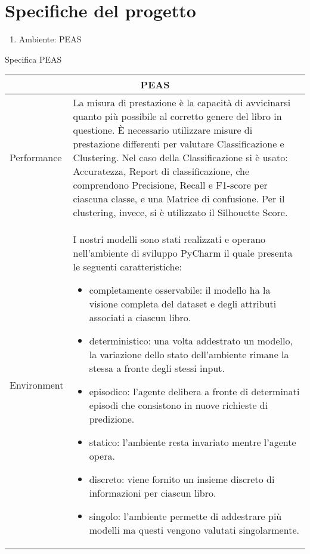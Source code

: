 \documentclass[12pt,oneside]{article}
\begin{document}
\section{Specifiche del progetto}
    \begin{enumerate}
        \item Ambiente: PEAS
    \end{enumerate}
    \begin{flushleft}
        Specifica PEAS
    \end{flushleft}
   
    \begin{table}[ht]
    \centering
    \begin{tabular}{ | p{3cm} | p{9cm} | }
    \hline
    \multicolumn{2}{|c|}{PEAS} \\
    \hline
    Performance & La misura di prestazione è la capacità di avvicinarsi quanto più possibile al corretto genere del libro in questione. È necessario utilizzare misure di prestazione differenti per valutare Classificazione e Clustering. Nel caso della Classificazione si è usato: Accuratezza, Report di classificazione, che comprendono Precisione, Recall e F1-score per ciascuna classe, e una Matrice di  confusione. Per il clustering, invece,  si è utilizzato il Silhouette Score.\\
    \hline
    Environment & I nostri modelli sono stati realizzati e operano nell'ambiente di sviluppo PyCharm il quale presenta le seguenti caratteristiche: \begin{itemize}
        \item completamente osservabile: il modello ha la visione completa del dataset e degli attributi associati a ciascun libro.
        \item deterministico: una volta addestrato un modello, la variazione dello stato dell'ambiente rimane la stessa a fronte degli stessi input.
        \item episodico: l'agente delibera a fronte di determinati episodi che consistono in nuove richieste di predizione.
        \item statico: l'ambiente resta invariato mentre l'agente opera.
        \item discreto: viene fornito un insieme discreto di informazioni per ciascun libro.
        \item singolo: l'ambiente permette di addestrare più modelli ma questi vengono valutati singolarmente.
    \end{itemize}
    

\end{tabular}
\end{table}
\end{document}
